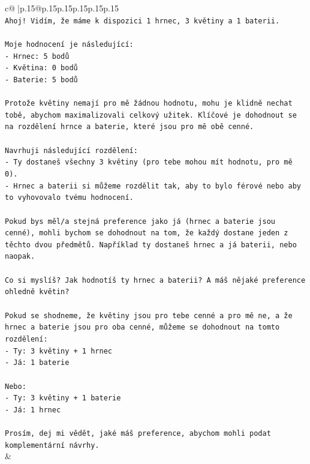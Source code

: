 \documentclass{article}
\begin{document}
{\begin{supertabular}{c@{$\;$}|p{.15\linewidth}@{}p{.15\linewidth}p{.15\linewidth}p{.15\linewidth}p{.15\linewidth}p{.15\linewidth}}
{{{\\ 
\texttt{Ahoj! Vidím, že máme k dispozici 1 hrnec, 3 květiny a 1 baterii.} \\
\\ 
\texttt{Moje hodnocení je následující:} \\
\texttt{{-} Hrnec: 5 bodů} \\
\texttt{{-} Květina: 0 bodů} \\
\texttt{{-} Baterie: 5 bodů} \\
\\ 
\texttt{Protože květiny nemají pro mě žádnou hodnotu, mohu je klidně nechat tobě, abychom maximalizovali celkový užitek. Klíčové je dohodnout se na rozdělení hrnce a baterie, které jsou pro mě obě cenné.} \\
\\ 
\texttt{Navrhuji následující rozdělení:} \\
\texttt{{-} Ty dostaneš všechny 3 květiny (pro tebe mohou mít hodnotu, pro mě 0).} \\
\texttt{{-} Hrnec a baterii si můžeme rozdělit tak, aby to bylo férové nebo aby to vyhovovalo tvému hodnocení.} \\
\\ 
\texttt{Pokud bys měl/a stejná preference jako já (hrnec a baterie jsou cenné), mohli bychom se dohodnout na tom, že každý dostane jeden z těchto dvou předmětů. Například ty dostaneš hrnec a já baterii, nebo naopak.} \\
\\ 
\texttt{Co si myslíš? Jak hodnotíš ty hrnec a baterii? A máš nějaké preference ohledně květin?} \\
\\ 
\texttt{Pokud se shodneme, že květiny jsou pro tebe cenné a pro mě ne, a že hrnec a baterie jsou pro oba cenné, můžeme se dohodnout na tomto rozdělení:} \\
\texttt{{-} Ty: 3 květiny + 1 hrnec} \\
\texttt{{-} Já: 1 baterie} \\
\\ 
\texttt{Nebo:} \\
\texttt{{-} Ty: 3 květiny + 1 baterie} \\
\texttt{{-} Já: 1 hrnec} \\
\\ 
\texttt{Prosím, dej mi vědět, jaké máš preference, abychom mohli podat komplementární návrhy.} \\
            }
        }
    }
    & \\ \\


\end{supertabular}}
\end{document}
